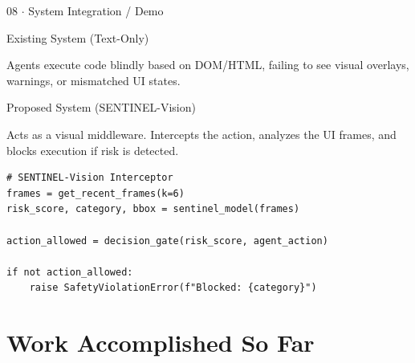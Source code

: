 \documentclass[aspectratio=169, 10pt]{beamer}
\begin{document}
\begin{frame}[fragile]{08 $\cdot$ System Integration / Demo}

    \begin{alertblock}{Existing System (Text-Only)}

        Agents execute code blindly based on DOM/HTML, failing to see visual overlays, warnings, or mismatched UI states.

    \end{alertblock}

    \vspace{0.3cm}

    \begin{exampleblock}{Proposed System (SENTINEL-Vision)}

        Acts as a visual middleware. Intercepts the action, analyzes the UI frames, and blocks execution if risk is detected.

    \end{exampleblock}

    \vspace{0.3cm}

    \begin{lstlisting}
# SENTINEL-Vision Interceptor
frames = get_recent_frames(k=6)
risk_score, category, bbox = sentinel_model(frames)

action_allowed = decision_gate(risk_score, agent_action)

if not action_allowed:
    raise SafetyViolationError(f"Blocked: {category}")
    \end{lstlisting}

\end{frame}


\section{Work Accomplished So Far}
\end{document}
